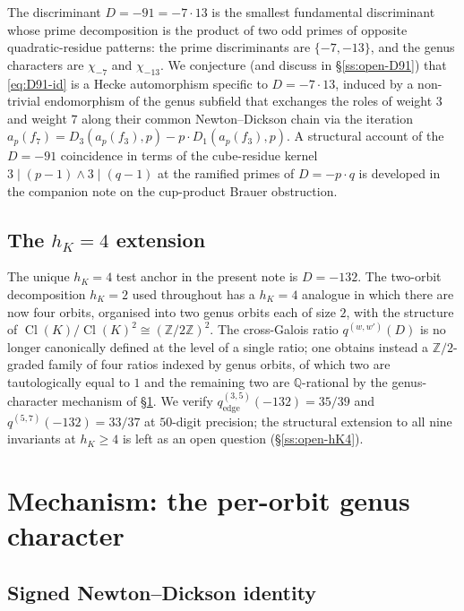 \documentclass[11pt,a4paper]{amsart}
\theoremstyle{plain}
\theoremstyle{definition}
\DeclareMathOperator{\Cl}{Cl}
\newcommand{\Q}{\mathbb{Q}}
\newcommand{\Z}{\mathbb{Z}}
\newcommand{\qstr}[2]{q^{(#1,#2)}}
\begin{document}
The discriminant $D = -91 = -7\cdot 13$ is the smallest fundamental
discriminant whose prime decomposition is the product of two odd primes of
opposite quadratic-residue patterns: the prime
discriminants are $\{-7, -13\}$, and the genus characters are
$\chi_{-7}$ and $\chi_{-13}$. We conjecture (and discuss in
\S\ref{ss:open-D91}) that \eqref{eq:D91-id} is a Hecke automorphism
specific to $D = -7\cdot 13$, induced by a non-trivial endomorphism of the
genus subfield that exchanges the roles of weight $3$ and weight $7$ along
their common Newton--Dickson chain via the iteration
$a_p(f_7) = D_3(a_p(f_3), p) - p\cdot D_1(a_p(f_3), p)$. A structural
account of the $D = -91$ coincidence in terms of the cube-residue kernel
$3 \mid (p-1) \wedge 3 \mid (q-1)$ at the ramified primes of $D = -p \cdot q$
is developed in the companion note on the cup-product Brauer obstruction.

\subsection{The $h_K = 4$ extension}\label{ss:hK4}

The unique $h_K = 4$ test anchor in the present note is $D = -132$. The
two-orbit decomposition $h_K = 2$ used throughout has a $h_K = 4$ analogue
in which there are now four orbits, organised into two genus orbits each of
size $2$, with the structure of $\Cl(K)/\Cl(K)^2 \cong (\Z/2\Z)^2$. The
cross-Galois ratio $\qstr{w}{w'}(D)$ is no longer canonically defined at
the level of a single ratio; one obtains instead a $\Z/2$-graded family of
four ratios indexed by genus orbits, of which two are tautologically equal
to $1$ and the remaining two are $\Q$-rational by the genus-character
mechanism of \S\ref{sec:mechanism}. We verify $\qstr{3}{5}_{\mathrm{edge}}
(-132) = 35/39$ and $\qstr{5}{7}(-132) = 33/37$ at $50$-digit precision;
the structural extension to all nine invariants at $h_K \ge 4$ is left as
an open question (\S\ref{ss:open-hK4}).

\section{Mechanism: the per-orbit genus character}\label{sec:mechanism}

\subsection{Signed Newton--Dickson identity}\label{ss:signed-ND}
\end{document}
